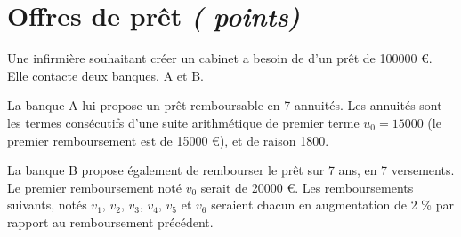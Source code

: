 \section{Offres de prêt \textit{( points)}}

Une infirmière souhaitant créer un cabinet a besoin de d'un prêt de \num{100000} €. Elle contacte deux banques, A et B.\\


\begin{questions}
	\question La banque A lui propose un prêt remboursable en 7 annuités. Les annuités sont les termes consécutifs d'une suite arithmétique de premier terme $u_0 = \num{15000}$ (le premier remboursement est de \num{15000} €), et de raison \num{1800}.
	

	\question La banque B propose également de rembourser le prêt sur 7 ans, en 7 versements. Le premier remboursement noté $v_0$ serait de \num{20000} €. Les remboursements suivants, notés $v_1$, $v_2$, $v_3$, $v_4$, $v_5$ et $v_6$ seraient chacun en augmentation de 2 \% par rapport au remboursement précédent.
	
\end{questions}
